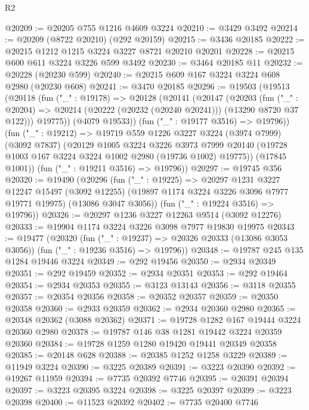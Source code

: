 \begin{lexlean}{R2}
\begin{coremodule}
@20209 := @20205 @755 @1216 @4609 @3224
@20210 := @3429 @3492
@20214 := @20209 (@8722 @20210) (@292 @20159)
@20215 := @3436 @20185
@20222 := @20215 @1212 @1215 @3224 @3227 @8721 @20210 @20201
@20228 := @20215 @600 @611 @3224 @3226 @599 @3492
@20230 := @3464 @20185 @11
@20232 := @20228 (@20230 @599)
@20240 := @20215 @609 @167 @3224 @3224 @608 @2980 (@20230 @608)
@20241 := @3470 @20185
@20296 := @19503
    (@19513
      (@20118
        (fun ("_" : @19178) =>
        @20128
          (@20141
            (@20147
              (@20203
                (fun ("_" : @20204) =>
                @20214 (@20222 (@20232 (@20240 @20241))) (@13290 @8720 @37 @122)))
              @19775))
          (@4079 @19533))
        (fun ("_" : @19177 @3516) => @19796))
      (fun ("_" : @19212) =>
      @19719
        @559
        @1226
        @3227
        @3224
        (@3974 @7999)
        (@3092 @7837)
        (@20129
          @1005
          @3224
          @3226
          @3973
          @7999
          @20140
          (@19728 @1003 @167 @3224 @3224 @1002 @2980 (@19736 @1002) @19775))
        (@17845 @1001))
      (fun ("_" : @19211 @3516) => @19796))
@20297 := @19745 @356
@20320 := @19490
    (@20296
      (fun ("_" : @19225) =>
      @20297
        @1231
        @3227
        @12247
        @15497
        (@3092 @12255)
        (@19897 @1174 @3224 @3226 @3096 @7977 @19771 @19975)
        (@13086 @3047 @3056))
      (fun ("_" : @19224 @3516) => @19796))
@20326 := @20297 @1236 @3227 @12263 @9514 (@3092 @12276)
@20333 := @19904 @1174 @3224 @3226 @3098 @7977 @19830 @19975
@20343 := @19477
    (@20320
      (fun ("_" : @19237) => @20326 @20333 (@13086 @3053 @3056))
      (fun ("_" : @19236 @3516) => @19796))
@20348 := @19787 @245 @135 @1284 @19446 @3224
@20349 := @292 @19456
@20350 := @2934 @20349
@20351 := @292 @19459
@20352 := @2934 @20351
@20353 := @292 @19464
@20354 := @2934 @20353
@20355 := @3123 @13143
@20356 := @3118 @20355
@20357 := @20354 @20356
@20358 := @20352 @20357
@20359 := @20350 @20358
@20360 := @2933 @20359
@20362 := @2934 @20360 @2980
@20365 := @20348 @20362 (@3088 @20362)
@20371 := @19728 @1282 @167 @19444 @3224 @20360 @2980
@20378 := @19787 @146 @38 @1281 @19442 @3224 @20359 @20360
@20384 := @19728 @1259 @1280 @19420 @19441 @20349 @20358
@20385 := @20148 @628
@20388 := @20385 @1252 @1258 @3229
@20389 := @11949 @3224
@20390 := @3225 @20389
@20391 := @3223 @20390
@20392 := @19267 @11959
@20394 := @7735 @20392 @7746
@20395 := @20391 @20394
@20397 := @3223 @20395 @3224
@20398 := @3225 @20397
@20399 := @3223 @20398
@20400 := @11523 @20392
@20402 := @7735 @20400 @7746

\end{coremodule}
\end{lexlean}

